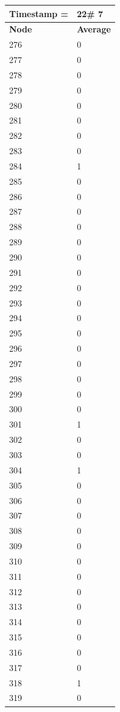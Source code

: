 \begin{tabular}{|l||l|}
\hline
\textbf{Timestamp =} & \textbf{22}\# 7\\\hline
	\textbf{Node} & \textbf{Average} \\ \hline
\hline
	276 & 0 \\ \hline
	277 & 0 \\ \hline
	278 & 0 \\ \hline
	279 & 0 \\ \hline
	280 & 0 \\ \hline
	281 & 0 \\ \hline
	282 & 0 \\ \hline
	283 & 0 \\ \hline
	284 & 1 \\ \hline
	285 & 0 \\ \hline
	286 & 0 \\ \hline
	287 & 0 \\ \hline
	288 & 0 \\ \hline
	289 & 0 \\ \hline
	290 & 0 \\ \hline
	291 & 0 \\ \hline
	292 & 0 \\ \hline
	293 & 0 \\ \hline
	294 & 0 \\ \hline
	295 & 0 \\ \hline
	296 & 0 \\ \hline
	297 & 0 \\ \hline
	298 & 0 \\ \hline
	299 & 0 \\ \hline
	300 & 0 \\ \hline
	301 & 1 \\ \hline
	302 & 0 \\ \hline
	303 & 0 \\ \hline
	304 & 1 \\ \hline
	305 & 0 \\ \hline
	306 & 0 \\ \hline
	307 & 0 \\ \hline
	308 & 0 \\ \hline
	309 & 0 \\ \hline
	310 & 0 \\ \hline
	311 & 0 \\ \hline
	312 & 0 \\ \hline
	313 & 0 \\ \hline
	314 & 0 \\ \hline
	315 & 0 \\ \hline
	316 & 0 \\ \hline
	317 & 0 \\ \hline
	318 & 1 \\ \hline
	319 & 0 \\ \hline
\end{tabular}


